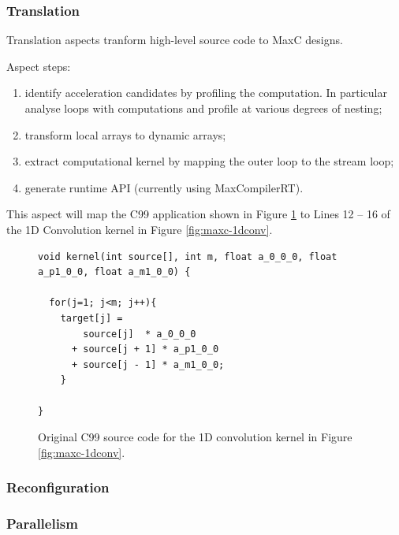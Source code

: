 \subsubsection{Translation}

Translation aspects tranform high-level source code to MaxC designs.

Aspect steps:
\begin{enumerate}

\item identify acceleration candidates by profiling the
  computation. In particular analyse loops with computations and
  profile at various degrees of nesting;

\item transform local arrays to dynamic arrays;

\item extract computational kernel by mapping the outer loop to the
  stream loop;

\item generate runtime API (currently using MaxCompilerRT).

\end{enumerate}

This aspect will map the C99 application shown in Figure
\ref{fig:c-design} to Lines 12 -- 16 of the 1D Convolution kernel in
Figure \ref{fig:maxc-1dconv}.


\begin{figure}[!h]
\centering
\begin{lstlisting}
void kernel(int source[], int m, float a_0_0_0, float a_p1_0_0, float a_m1_0_0) {

  for(j=1; j<m; j++){
    target[j] =
        source[j]  * a_0_0_0
      + source[j + 1] * a_p1_0_0
      + source[j - 1] * a_m1_0_0;
    }

}
\end{lstlisting}
\caption{Original C99 source code for the 1D convolution kernel in
  Figure \ref{fig:maxc-1dconv}.}
\label{fig:c-design}
\end{figure}

\subsubsection{\TODO Reconfiguration}


\subsubsection{\TODO Parallelism}

